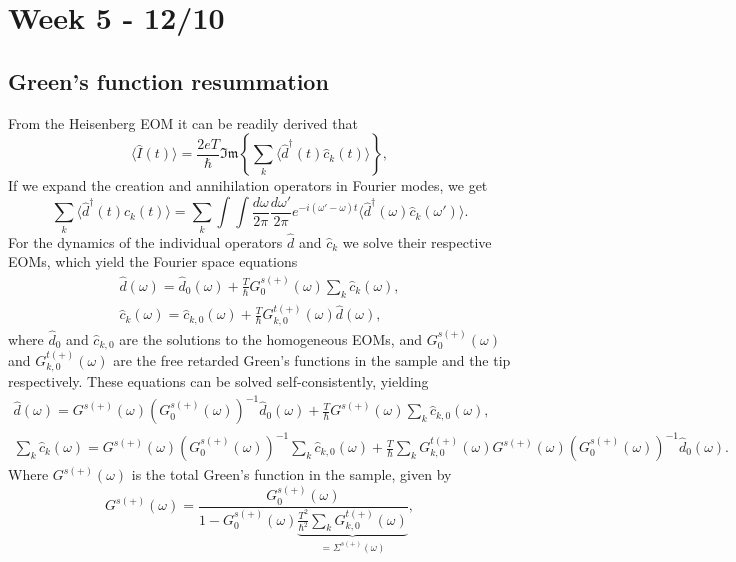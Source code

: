 \section{Week 5 - 12/10}
\subsection{Green's function resummation}
\newcommand{\ta}{T}
From the Heisenberg EOM it can be readily derived that
\begin{equation}
    \langle\hat{I}(t)\rangle = \frac{2eT}{\hbar} \mathfrak{Im}\left\{\sum_k\langle \hat{d}^\dagger(t) \hat{c}_k(t)\rangle\right\},
\end{equation}
If we expand the creation and annihilation operators in Fourier modes, we get
\begin{equation}\label{eq:timeexp}
    \sum_k \langle{\hat{d}^\dagger(t)\hat{c}_k(t)}\rangle = \sum_k\int\int\frac{d\omega}{2\pi}\frac{d\omega'}{2\pi}e^{-i(\omega'-\omega)t}\langle\hat{d}^\dagger(\omega)\hat{c}_k(\omega')\rangle.
\end{equation}
For the dynamics of the individual operators $\hat{d}$ and $\hat{c}_k$ we solve their respective EOMs, which yield the Fourier space equations
\begin{gather}
    \hat{d}(\omega) = \hat{d}_0(\omega) + \frac{\ta}{\hbar} G^{s (+)}_0(\omega)\sum_k\hat{c}_k(\omega), \\
    \hat{c}_k(\omega) = \hat{c}_{k,0}(\omega) + \frac{\ta}{\hbar} G^{t (+)}_{k,0}(\omega)\hat{d}(\omega),
\end{gather}
where $\hat{d}_0$ and $\hat{c}_{k,0}$ are the solutions to the homogeneous EOMs, and $G^{s (+)}_0(\omega)$ and $G^{t (+)}_{k,0}(\omega)$ are the free retarded Green's functions in the sample and the tip respectively. These equations can be solved self-consistently, yielding
\begin{gather}
    \hat{d}(\omega) = G^{s(+)}(\omega)\left(G^{s(+)}_0(\omega)\right)^{-1}\hat{d}_0(\omega) + \frac{\ta}{\hbar} G^{s(+)}(\omega)\sum_k\hat{c}_{k,0}(\omega),\\
    \sum_k\hat{c}_k(\omega) = G^{s(+)}(\omega)\left(G^{s(+)}_0(\omega)\right)^{-1}\sum_k\hat{c}_{k,0}(\omega) + \frac{\ta}{\hbar} \sum_kG^{t(+)}_{k,0}(\omega) G^{s(+)}(\omega)\left(G^{s(+)}_0(\omega)\right)^{-1}\hat{d}_0(\omega).
\end{gather}
Where $G^{s(+)}(\omega)$ is the total Green's function in the sample, given by
\begin{equation}
    G^{s(+)}(\omega) = \frac{G^{s(+)}_0(\omega)}{1 - G^{s(+)}_0(\omega)\underbrace{\frac{\ta^2}{\hbar^2}\sum_kG^{t(+)}_{k,0}(\omega)}_{=\Sigma^{s(+)}(\omega)}},
\end{equation}
